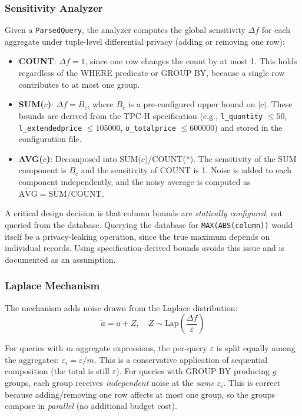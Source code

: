 \documentclass[sigconf,nonacm]{acmart}
\begin{document}
\subsubsection{Sensitivity Analyzer}

Given a \texttt{ParsedQuery}, the analyzer computes the global sensitivity $\Delta f$ for each aggregate under tuple-level differential privacy (adding or removing one row):

\begin{itemize}
    \item \textbf{COUNT}: $\Delta f = 1$, since one row changes the count by at most 1. This holds regardless of the WHERE predicate or GROUP BY, because a single row contributes to at most one group.
    \item \textbf{SUM($c$)}: $\Delta f = B_c$, where $B_c$ is a pre-configured upper bound on $|c|$. These bounds are derived from the TPC-H specification (e.g., \texttt{l\_quantity} $\leq 50$, \texttt{l\_extendedprice} $\leq 105000$, \texttt{o\_totalprice} $\leq 600000$) and stored in the configuration file.
    \item \textbf{AVG($c$)}: Decomposed into SUM($c$)/COUNT(*). The sensitivity of the SUM component is $B_c$ and the sensitivity of COUNT is 1. Noise is added to each component independently, and the noisy average is computed as $\widetilde{\text{AVG}} = \widetilde{\text{SUM}} / \widetilde{\text{COUNT}}$.
\end{itemize}

A critical design decision is that column bounds are \emph{statically configured}, not queried from the database. Querying the database for \texttt{MAX(ABS(column))} would itself be a privacy-leaking operation, since the true maximum depends on individual records. Using specification-derived bounds avoids this issue and is documented as an assumption.

\subsubsection{Laplace Mechanism}

The mechanism adds noise drawn from the Laplace distribution:
\[
\tilde{a} = a + Z, \quad Z \sim \text{Lap}\left(\frac{\Delta f}{\varepsilon}\right)
\]

For queries with $m$ aggregate expressions, the per-query $\varepsilon$ is split equally among the aggregates: $\varepsilon_i = \varepsilon / m$. This is a conservative application of sequential composition (the total is still $\varepsilon$). For queries with GROUP BY producing $g$ groups, each group receives \emph{independent} noise at the \emph{same} $\varepsilon_i$. This is correct because adding/removing one row affects at most one group, so the groups compose in \emph{parallel} (no additional budget cost).
\end{document}
